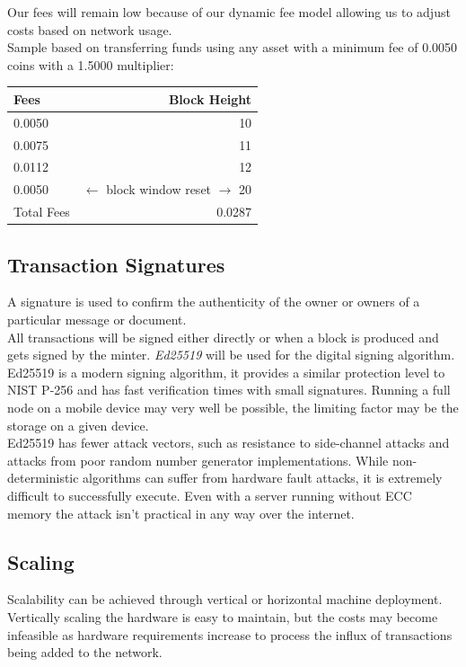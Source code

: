 \documentclass[12pt,a4paper]{article}
\begin{document}
  Our fees will remain low because of our dynamic fee model allowing us to
  adjust costs based on network usage.\\

  Sample based on transferring funds using any asset with a minimum fee of
  0.0050 coins with a 1.5000 multiplier:

  \vspace{3mm}
  \begin{tabular}{@{}lr@{}}
    Fees & Block Height     \\ \toprule
    0.0050 & 10             \\
    0.0075 & 11             \\
    0.0112 & 12             \\
    0.0050 & $\leftarrow{}$ block window reset $\rightarrow{}$ 20 \\ \midrule{}
    Total Fees & 0.0287     \\
    \bottomrule
  \end{tabular}

  \subsection{Transaction Signatures}
  A signature is used to confirm the authenticity of the owner or owners
  of a particular message or document.\\

  All transactions will be signed either directly or when a block is produced
  and gets signed by the minter. \textit{Ed25519}\cite{ed25519} will be used for
  the digital signing algorithm. Ed25519 is a modern signing algorithm, it
  provides a similar protection level to NIST P-256 and has fast verification
  times with small signatures. Running a full node on a mobile device may very
  well be possible, the limiting factor may be the storage on a given device.\\

  Ed25519 has fewer attack vectors, such as resistance to side-channel attacks
  and attacks from poor random number generator implementations. While
  non-deterministic algorithms can suffer from hardware fault attacks, it is
  extremely difficult to successfully execute. Even with a server running
  without ECC memory the attack isn't practical in any way over the
  internet.

  \subsection{Scaling}
  Scalability can be achieved through vertical or horizontal machine deployment.
  Vertically scaling the hardware is easy to maintain, but the costs may become
  infeasible as hardware requirements increase to process the influx of
  transactions being added to the network.\\
\end{document}
